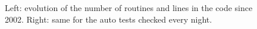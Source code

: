 \documentclass{article}
\begin{document}
\begin{figure}[h!]
\caption{Left: evolution of the number of routines and lines in
the code since 2002. Right: same for the auto tests checked
every night.}
\label{fig}
\end{figure}
\end{document}

